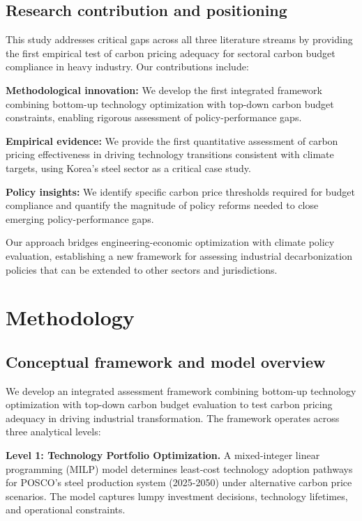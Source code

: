 \documentclass[preprint,5p,authoryear]{elsarticle}
\begin{document}
\subsection{Research contribution and positioning}

This study addresses critical gaps across all three literature streams by providing the first empirical test of carbon pricing adequacy for sectoral carbon budget compliance in heavy industry. Our contributions include:

\textbf{Methodological innovation:} We develop the first integrated framework combining bottom-up technology optimization with top-down carbon budget constraints, enabling rigorous assessment of policy-performance gaps.

\textbf{Empirical evidence:} We provide the first quantitative assessment of carbon pricing effectiveness in driving technology transitions consistent with climate targets, using Korea's steel sector as a critical case study.

\textbf{Policy insights:} We identify specific carbon price thresholds required for budget compliance and quantify the magnitude of policy reforms needed to close emerging policy-performance gaps.

Our approach bridges engineering-economic optimization with climate policy evaluation, establishing a new framework for assessing industrial decarbonization policies that can be extended to other sectors and jurisdictions.

\section{Methodology}

\subsection{Conceptual framework and model overview}

We develop an integrated assessment framework combining bottom-up technology optimization with top-down carbon budget evaluation to test carbon pricing adequacy in driving industrial transformation. The framework operates across three analytical levels:

\textbf{Level 1: Technology Portfolio Optimization.} A mixed-integer linear programming (MILP) model determines least-cost technology adoption pathways for POSCO's steel production system (2025-2050) under alternative carbon price scenarios. The model captures lumpy investment decisions, technology lifetimes, and operational constraints.
\end{document}
